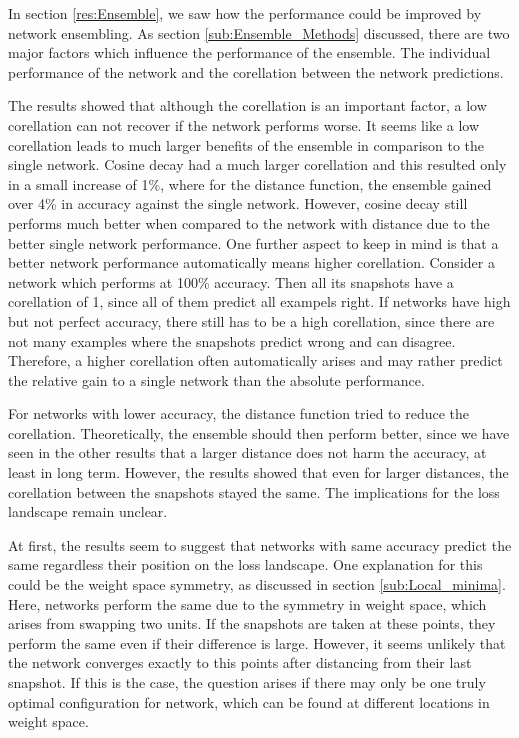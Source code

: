 In section \ref{res:Ensemble}, we saw how the performance could be improved by
network ensembling. As section \ref{sub:Ensemble_Methods} discussed, there are
two major factors which influence the performance of the ensemble. The
individual performance of the network and the corellation between the network
predictions.

The results showed that although the corellation is an important factor, a low
corellation can not recover if the network performs worse. It seems like a low
corellation leads to much larger benefits of the ensemble in comparison to the
single network. Cosine decay had a much larger corellation and this resulted
only in a small increase of 1\%, where for the distance function, the
ensemble gained over 4\% in accuracy against the single network. However, cosine
decay still performs much better when compared to the network with distance due to the better
single network performance. One further aspect to keep in mind is that a better
network performance automatically means higher corellation. Consider a network
which performs at 100\% accuracy. Then all its snapshots have a corellation of
1, since all of them predict all exampels right. If networks have high but not
perfect accuracy, there still has to be a high corellation, since there are not
many examples where the snapshots predict wrong and can disagree. Therefore, a
higher corellation often automatically arises and may rather predict the
relative gain to a single network than the absolute performance.

For networks with lower accuracy, the distance function tried to reduce the
corellation. Theoretically, the ensemble should then perform better, since we
have seen in the other results that a larger distance does not harm the
accuracy, at least in long term. However, the results showed that even for
larger distances, the corellation between the snapshots stayed the same. The
implications for the loss landscape remain unclear.

At first, the results seem to suggest that networks with same accuracy predict
the same regardless their position on the loss landscape. One explanation for
this could be the weight space symmetry, as discussed in section
\ref{sub:Local_minima}. Here, networks perform the same due to the symmetry in
weight space, which arises from swapping two units. If the snapshots are taken
at these points, they perform the same even if their difference is large.
However, it seems unlikely that the network converges exactly to this points
after distancing from their last snapshot. If this is the case, the question
arises if there may only be one truly optimal configuration for network, which
can be found at different locations in weight space.

